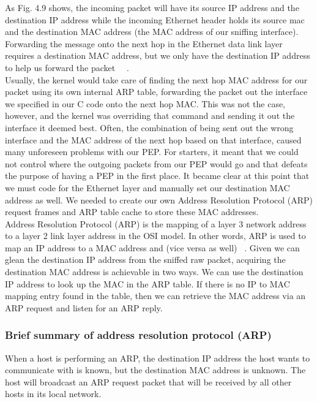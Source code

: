 As Fig. 4.9 shows, the incoming packet will have its source IP address and the destination IP address while the incoming Ethernet header holds its source mac and the destination MAC address (the MAC address of our sniffing interface). Forwarding the message onto the next hop in the Ethernet data link layer requires a destination MAC address, but we only have the destination IP address to help us forward the packet ~\cite{1}~\cite{2}.\\

Usually, the kernel would take care of finding the next hop MAC address for our packet using its own internal ARP table, forwarding the packet out the interface we specified in our C code onto the next hop MAC. This was not the case, however, and the kernel was overriding that command and sending it out the interface it deemed best. Often, the combination of being sent out the wrong interface and the MAC address of the next hop based on that interface, caused many unforeseen problems with our PEP. For starters, it meant that we could not control where the outgoing packets from our PEP would go and that defeats the purpose of having a PEP in the first place. It became clear at this point that we must code for the Ethernet layer and manually set our destination MAC address as well. We needed to create our own Address Resolution Protocol (ARP) request frames and ARP table cache to store these MAC addresses. \\

Address Resolution Protocol (ARP) is the mapping of a layer 3 network address to a layer 2 link layer address in the OSI model. In other words, ARP is used to map an IP address to a MAC address and (vice versa as well) ~\cite{1}. Given we can glean the destination IP address from the sniffed raw packet, acquiring the destination MAC address is achievable in two ways. We can use the destination IP address to look up the MAC in the ARP table. If there is no IP to MAC mapping entry found in the table, then we can retrieve the MAC address via an ARP request and listen for an ARP reply. 

\subsubsection{Brief summary of address resolution protocol (ARP)}
When a host is performing an ARP, the destination IP address the host wants to communicate with is known, but the destination MAC address is unknown. The host will broadcast an ARP request packet that will be received by all other hosts in its local network. \\

